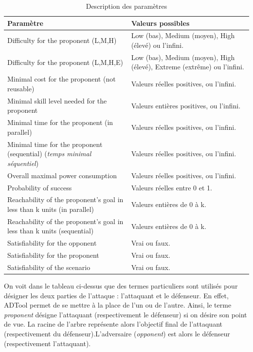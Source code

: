 			\begin{table}[!h]
				\centering
				\begin{tabular}{|p{6cm}|p{5cm}|}
					\hline
					\textbf{Paramètre} & \textbf{Valeurs possibles} \\
					\hline
					Difficulty for the proponent (L,M,H) & 
						Low (bas), Medium (moyen), High (élevé) ou l'infini.\\ 
					\hline
					Difficulty for the proponent (L,M,H,E) & 
						Low (bas), Medium (moyen), High (élevé), Extreme (extrême) ou l'infini.\\ 
					\hline
					Minimal cost for the proponent (not reusable) & 
						Valeurs réelles positives, ou l'infini.\\ 
					\hline
					Minimal skill level needed for the proponent & 
						Valeurs entières positives, ou l'infini.\\ 
					\hline
					Minimal time for the proponent (in parallel) & 
						Valeurs réelles positives, ou l'infini.\\ 
					\hline
					Minimal time for the proponent (sequential) (\textit{temps minimal séquentiel}) & 
						Valeurs réelles positives, ou l'infini.\\ 
					\hline
					Overall maximal power consumption & 
						Valeurs réelles positives, ou l'infini.\\ 
					\hline
					Probability of success &
						Valeurs réelles entre 0 et 1.\\ 
					\hline
					Reachability of the proponent's goal in less than k units (in parallel) & 
						Valeurs entières de 0 à k. \\ 
					\hline
					Reachability of the proponent's goal in less than k units (sequential) & 
						Valeurs entières de 0 à k. \\ 
					\hline
					Satisfiability for the opponent & 
						Vrai ou faux. \\ 
					\hline
					Satisfiability for the proponent & 
						Vrai ou faux. \\ 
					\hline
					Satisfiability of the scenario & 
						Vrai ou faux. \\
					\hline
				\end{tabular}
				\caption{Description des paramètres}
				\label{tab:DescriptionParam}
			\end{table}

			On voit dans le tableau ci-dessus que des termes particuliers sont utilisés pour désigner les deux parties de l'attaque : l'attaquant et le défenseur. En effet, ADTool permet de se mettre à la place de l'un ou de l'autre. Ainsi, le terme \textit{proponent} désigne l'attaquant (respectivement le défenseur) si on désire son point de vue. La racine de l'arbre représente alors l'objectif final de l'attaquant (respectivement du défenseur).L'adversaire (\textit{opponent}) est alors le défenseur (respectivement l'attaquant).
	
